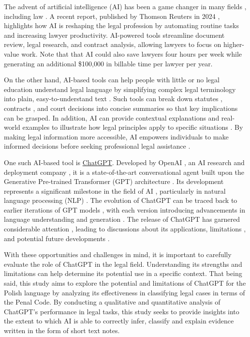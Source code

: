 \documentclass[preprint,12pt,number]{elsarticle}
\begin{document}
The advent of artificial intelligence (AI) has been a game changer in many fields \cite{pondel2024ai, yuan2024artificial, rampavsek2025evolving}, including law \cite{ashley2019brief}. A recent report, published by Thomson Reuters in 2024 \cite{TR-2024}, highlights how AI is reshaping the legal profession by automating routine tasks and increasing lawyer productivity. AI-powered tools streamline document review, legal research, and contract analysis, allowing lawyers to focus on higher-value work. Note that that AI could also save lawyers four hours per week while generating an additional \$100,000 in billable time per lawyer per year.

On the other hand, AI-based tools can help people with little or no legal education understand legal language by simplifying complex legal terminology into plain, easy-to-understand text \cite{weber2024legalwriter}. Such tools can break down statutes \cite{surden2021machine}, contracts \cite{autto2024contracts}, and court decisions \cite{habernal2024mining} into concise summaries so that key implications can be grasped. In addition, AI can provide contextual explanations and real-world examples to illustrate how legal principles apply to specific situations \cite{prakken2015law}. By making legal information more accessible, AI empowers individuals to make informed decisions before seeking professional legal assistance \cite{lorek2024ai}.

One such AI-based tool is \href{https://chatgpt.com/}{ChatGPT}. Developed by OpenAI \cite{lozic2023fluent}, an AI research and deployment company \cite{hang2024large}, it is a state-of-the-art conversational agent built upon the Generative Pre-trained Transformer (GPT) architecture \cite{yenduri2024gpt}. Its development represents a significant milestone in the field of AI \cite{wu2023brief}, particularly in natural language processing (NLP) \cite{Belcic2024}. The evolution of ChatGPT can be traced back to earlier iterations of GPT models \cite{banik2024systematic}, with each version introducing advancements in language understanding and generation \cite{salloum2024coming}. The release of ChatGPT has garnered considerable attention \cite{khan2024global}, leading to discussions about its applications, limitations , and potential future developments \cite{dale2021gpt, sohail2023future, kozachek2023investigating}. 

With these opportunities and challenges in mind, it is important to carefully evaluate the role of ChatGPT in the legal field. Understanding its strengths and limitations can help determine its potential use in a specific context. That being said, this study aims to explore the potential and limitations of ChatGPT for the Polish language by analyzing its effectiveness in classifying legal cases in terms of the Penal Code. By conducting a qualitative and quantitative analysis of ChatGPT's performance in legal tasks, this study seeks to provide insights into the extent to which AI is able to correctly infer, classify and explain evidence written in the form of short text notes. 
\end{document}
